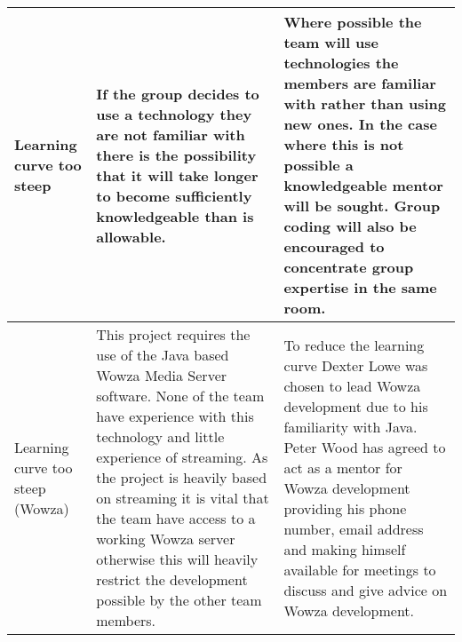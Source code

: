 \begin{center}
\begin{landscape}
\begin{longtable}{>{\raggedright}p{3cm}  >{\raggedright}p{7cm}  p{12cm}}
        Learning curve too steep                         & If the group decides to use a technology they are not familiar with there is the possibility that it will take longer to become sufficiently knowledgeable than is allowable.                                                                                                                                                                                                & Where possible the team will use technologies the members are familiar with rather than using new ones. In the case where this is not possible a knowledgeable mentor will be sought. Group coding will also be encouraged to concentrate group expertise in the same room.                                                                                                                                                                                                                                                                                                                                                                                                                                                                                                                                                                                                                                                                                                                                                              \\ \midrule
        Learning curve too steep (Wowza)                 & This project requires the use of the Java based Wowza Media Server software. None of the team have experience with this technology and little experience of streaming. As the project is heavily based on streaming it is vital that the team have access to a working Wowza server otherwise this will heavily restrict the development possible by the other team members. & To reduce the learning curve Dexter Lowe was chosen to lead Wowza development due to his familiarity with Java. Peter Wood has agreed to act as a mentor for Wowza development providing his phone number, email address and making himself available for meetings to discuss and give advice on Wowza development.                                                                                                                                                                                                                                                                                                                                                                                                                                                                                                                                                                                                                                                                                                                      \\ \midrule

\end{longtable}
\end{landscape}
\end{center}
